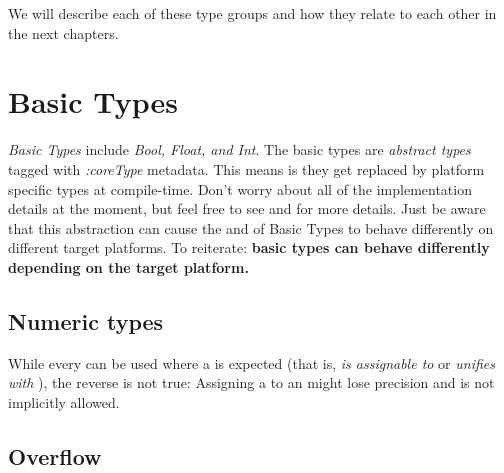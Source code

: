 \documentclass{haxe}
\begin{document}
We will describe each of these type groups and how they relate to each other in the next chapters.



\section{Basic Types}
\label{types-basic-types}



\emph{Basic Types} include \emph{Bool, Float, and Int}.  The basic types are \emph{abstract types} tagged with \emph{:coreType} metadata.  This means is they get replaced by platform specific types at compile-time.  Don't worry about all of the implementation details at the moment, but feel free to see  and  for more details.  Just be aware that this abstraction can cause the  and  of Basic Types to behave differently on different target platforms.  To reiterate: \textbf{basic types can behave differently depending on the target platform.}

\subsection{Numeric types}
\label{types-numeric-types}

While every  can be used where a  is expected (that is,  \emph{is assignable to} or \emph{unifies with} ), the reverse is not true: Assigning a  to an  might lose precision and is not implicitly allowed.

\subsection{Overflow}
\label{types-overflow}
\end{document}
